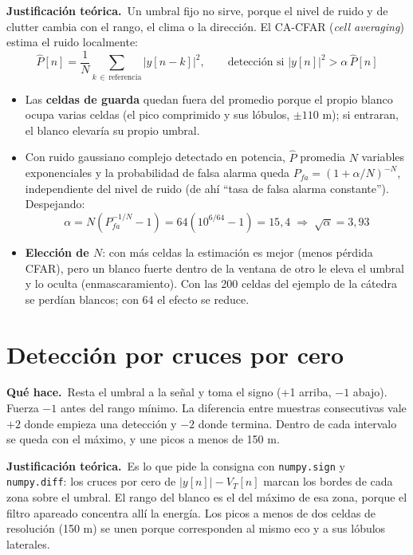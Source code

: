 \documentclass[11pt]{article}
\newcommand{\codigo}[2]{}
\newcommand{\teoria}{\par\textcolor{verde}{\textbf{Justificación teórica.}}\ }
\newcommand{\hace}{\par\textcolor{verde}{\textbf{Qué hace.}}\ }
\newcommand{\archivo}[1]{\texttt{#1}}
\begin{document}
\teoria Un umbral fijo no sirve, porque el nivel de ruido y de clutter cambia con el rango, el clima o la dirección. El CA-CFAR (\textit{cell averaging}) estima el ruido localmente:
\[ \hat P[n] = \frac{1}{N}\sum_{k\,\in\,\text{referencia}} |y[n-k]|^2, \qquad \text{detección si } |y[n]|^2 > \alpha\,\hat P[n] \]
\begin{itemize}
  \item Las \textbf{celdas de guarda} quedan fuera del promedio porque el propio blanco ocupa varias celdas (el pico comprimido y sus lóbulos, $\pm 110$ m); si entraran, el blanco elevaría su propio umbral.
  \item Con ruido gaussiano complejo detectado en potencia, $\hat P$ promedia $N$ variables exponenciales y la probabilidad de falsa alarma queda $P_{fa} = (1 + \alpha/N)^{-N}$, independiente del nivel de ruido (de ahí ``tasa de falsa alarma constante''). Despejando:
  \[ \alpha = N\left(P_{fa}^{-1/N} - 1\right) = 64\left(10^{6/64} - 1\right) = 15{,}4 \;\Rightarrow\; \sqrt{\alpha} = 3{,}93 \]
  \item \textbf{Elección de $N$}: con más celdas la estimación es mejor (menos pérdida CFAR), pero un blanco fuerte dentro de la ventana de otro le eleva el umbral y lo oculta (enmascaramiento). Con las 200 celdas del ejemplo de la cátedra se perdían blancos; con 64 el efecto se reduce.
\end{itemize}

\section{Detección por cruces por cero}
\codigo{125}{148}
\hace Resta el umbral a la señal y toma el signo (+1 arriba, $-1$ abajo). Fuerza $-1$ antes del rango mínimo. La diferencia entre muestras consecutivas vale $+2$ donde empieza una detección y $-2$ donde termina. Dentro de cada intervalo se queda con el máximo, y une picos a menos de 150 m.

\teoria Es lo que pide la consigna con \archivo{numpy.sign} y \archivo{numpy.diff}: los cruces por cero de $|y[n]| - V_T[n]$ marcan los bordes de cada zona sobre el umbral. El rango del blanco es el del máximo de esa zona, porque el filtro apareado concentra allí la energía. Los picos a menos de dos celdas de resolución (150 m) se unen porque corresponden al mismo eco y a sus lóbulos laterales.

\end{document}
